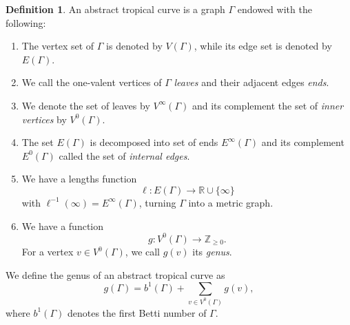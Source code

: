 \documentclass[10pt,a4paper,oneside,no-math,reqno]{amsart}%
\theoremstyle{plain}
\theoremstyle{definition}
\newtheorem{definition}[theorem]{Definition}
\theoremstyle{remark}
\numberwithin{equation}{section}
\newcommand{\1}{\mathds{1}}
\newcommand{\<}{\langle}
\renewcommand{\>}{\rangle}
\begin{document}
\begin{definition}
    An abstract tropical curve is a graph $\Gamma$ endowed with the following:
    \begin{enumerate}
        \item The vertex set of $\Gamma$ is denoted by $V(\Gamma)$, while its edge set is denoted by $E(\Gamma)$.
        \item We call the one-valent vertices of $\Gamma$ \emph{leaves} and their adjacent edges \emph{ends}.
        \item We denote the set of leaves by $V^\infty(\Gamma)$ and its complement the set of \emph{inner vertices} by $V^0(\Gamma)$.
        \item The set $E(\Gamma)$ is decomposed into set of ends $E^\infty(\Gamma)$ and its complement $E^0(\Gamma)$ called the set of \emph{internal edges}.
        \item We have a lengths function
        \begin{equation}
            \ell \colon E(\Gamma)\to\mathbb{R}\cup\{\infty\}
        \end{equation}
        with $\ell^{-1}(\infty)=E^\infty(\Gamma)$, turning $\Gamma$ into a metric graph.
        \item We have a function
        \begin{equation}
            g \colon V^0(\Gamma)\to\mathbb{Z}_{\ge0}.
        \end{equation}
        For a vertex $v\in V^0(\Gamma)$, we call $g(v)$ its \emph{genus}.
    \end{enumerate}
    We define the genus of an abstract tropical curve as
    \begin{equation}
        g(\Gamma)
        =
        b^1(\Gamma)+\sum_{v\in V^0(\Gamma)}g(v),
    \end{equation}
    where $b^1(\Gamma)$ denotes the first Betti number of $\Gamma$.

\end{definition}
\end{document}
